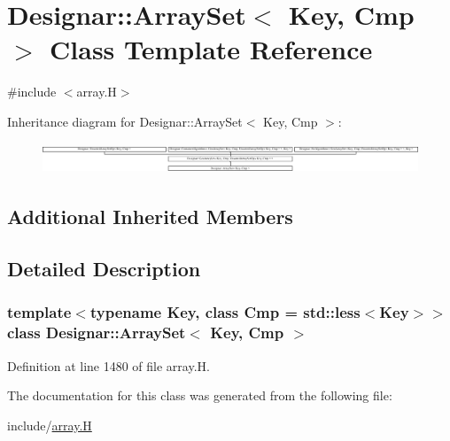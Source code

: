 \hypertarget{class_designar_1_1_array_set}{}\section{Designar\+:\+:Array\+Set$<$ Key, Cmp $>$ Class Template Reference}
\label{class_designar_1_1_array_set}


{\ttfamily \#include $<$array.\+H$>$}

Inheritance diagram for Designar\+:\+:Array\+Set$<$ Key, Cmp $>$\+:\begin{figure}[H]
\begin{center}
\leavevmode
\includegraphics[height=0.922570cm]{class_designar_1_1_array_set}
\end{center}
\end{figure}
\subsection*{Additional Inherited Members}


\subsection{Detailed Description}
\subsubsection*{template$<$typename Key, class Cmp = std\+::less$<$\+Key$>$$>$\newline
class Designar\+::\+Array\+Set$<$ Key, Cmp $>$}



Definition at line 1480 of file array.\+H.



The documentation for this class was generated from the following file\+:\begin{DoxyCompactItemize}
\item 
include/\hyperlink{array_8_h}{array.\+H}\end{DoxyCompactItemize}
